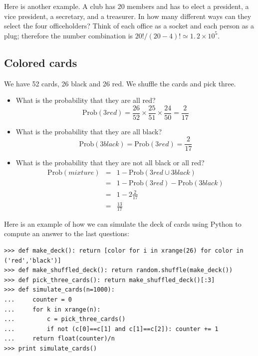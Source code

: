 \documentclass[justified,sixbynine]{tufte-book}
\def\ft{\small\tt}
\theoremstyle{plain}%
\theoremstyle{definition}
\theoremstyle{remark}
\begin{document}
\begin{fullwidth}
Here is another example. A club has 20 members and has to elect a president, a vice president,
a secretary, and a treasurer. In how many different ways can they select the
four officeholders? Think of each office as a socket and each person as a
plug; therefore the number combination is $20!/(20-4)!\simeq \allowbreak
1.\,2\times 10^5$.

\goodbreak\subsection{Colored cards}

We have 52 cards, 26 black and 26 red. We shuffle the cards and pick three.

\begin{itemize}
\item  What is the probability that they are all red?
\begin{equation}
\textrm{Prob}(3red)=\frac{26}{52}\times \frac{25}{51}\times \frac{24}{50}=\frac{2}{17}
\end{equation}

\item  What is the probability that they are all black?
\begin{equation}
\textrm{Prob}(3black)=\textrm{Prob}(3red)=\frac{2}{17}
\end{equation}

\item  What is the probability that they are not all black or all red?
\begin{eqnarray}
\textrm{Prob}(mixture) &=&1-\textrm{Prob}(3red\cup 3black) \\
&=&1-\textrm{Prob}(3red)-\textrm{Prob}(3black) \\
&=&1-2\frac{2}{17} \\
&=&\frac{13}{17}
\end{eqnarray}
\end{itemize}

Here is an example of how we can simulate the deck of cards using Python to compute an answer to the last questions:

\begin{lstlisting}[caption={in file: {\ft tests.py}}]
>>> def make_deck(): return [color for i in xrange(26) for color in ('red','black')]
>>> def make_shuffled_deck(): return random.shuffle(make_deck())
>>> def pick_three_cards(): return make_shuffled_deck()[:3]
>>> def simulate_cards(n=1000):
...     counter = 0
...     for k in xrange(n):
...         c = pick_three_cards()
...         if not (c[0]==c[1] and c[1]==c[2]): counter += 1
...     return float(counter)/n
>>> print simulate_cards()
\end{lstlisting}


\end{fullwidth}
\end{document}

